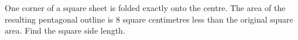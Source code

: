 One corner of a square sheet is folded exactly onto the centre. The area of the resulting pentagonal outline is $8$ square centimetres less than the original square area. Find the square side length.
